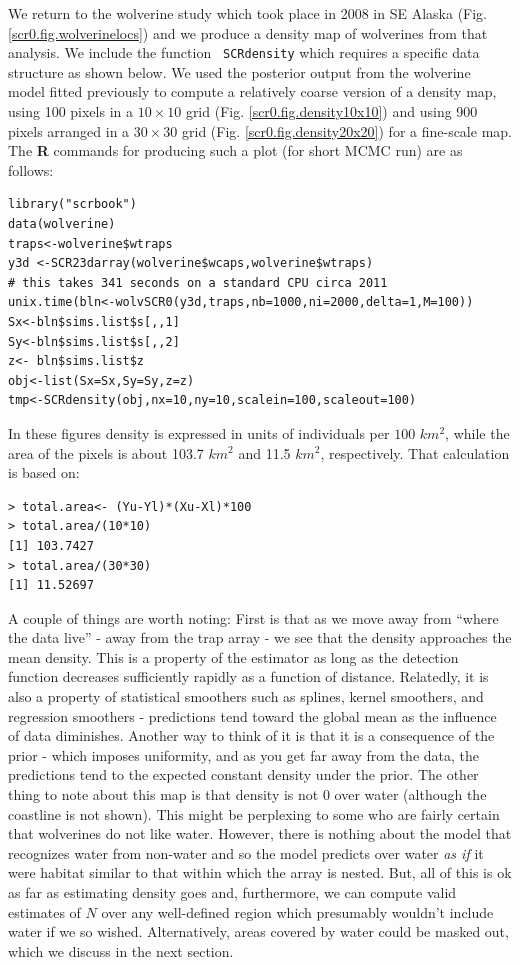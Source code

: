 {We return to the wolverine study which took place in 2008 in SE Alaska
(Fig. \ref{scr0.fig.wolverinelocs}) and we produce a density map of
wolverines from that analysis. We include the function \mbox{\tt
  SCRdensity} which requires a specific data structure as shown
below. 
We used the posterior output from the wolverine model fitted previously
to compute a relatively coarse version of a density map, using 100
pixels in a $10 \times
10$ grid (Fig. \ref{scr0.fig.density10x10}) and using 900 pixels
arranged in
 a $30 \times 30$
grid (Fig. \ref{scr0.fig.density20x20}) for a fine-scale map. The {\bf R} commands for
producing such a plot (for short MCMC run) are as follows:
{\small
\begin{verbatim}
library("scrbook")
data(wolverine)
traps<-wolverine$wtraps
y3d <-SCR23darray(wolverine$wcaps,wolverine$wtraps)
# this takes 341 seconds on a standard CPU circa 2011
unix.time(bln<-wolvSCR0(y3d,traps,nb=1000,ni=2000,delta=1,M=100))
Sx<-bln$sims.list$s[,,1]
Sy<-bln$sims.list$s[,,2]
z<- bln$sims.list$z
obj<-list(Sx=Sx,Sy=Sy,z=z)
tmp<-SCRdensity(obj,nx=10,ny=10,scalein=100,scaleout=100)
\end{verbatim}
In these figures density is
expressed in units of individuals per $100$ $km^2$, while the area of
the pixels is about 103.7 $km^2$ and 11.5 $km^2$, respectively. That
calculation is based on:
\begin{verbatim}
> total.area<- (Yu-Yl)*(Xu-Xl)*100
> total.area/(10*10)
[1] 103.7427
> total.area/(30*30)
[1] 11.52697
\end{verbatim}

A couple of things are worth noting: First is that as we move away
from ``where the data live'' - away from the trap array - we see that
the density approaches the mean density. This is a property of the
estimator as long as the detection function decreases sufficiently
rapidly as a function of distance.  Relatedly, it is also a property
of statistical smoothers such as splines, kernel smoothers, and
regression smoothers - predictions tend toward the global mean as the
influence of data diminishes. 
 Another way to think of it is that it is
a consequence of the prior - which imposes uniformity, and as you get
far away from the data, the predictions tend to the expected constant
density under the prior.  The other thing to note about this map is
that density is not $0$ over water (although the coastline is not
shown). This might be perplexing to some who are fairly certain that
wolverines do not like water. However, there is nothing about the
model that recognizes water from non-water and so the model predicts
over water {\it as if} it were habitat similar to that within which
the array is nested. But, all of this is ok as far as estimating
density goes and, furthermore, we can compute valid estimates of $N$
over any well-defined region which presumably wouldn't include water
if we so wished. Alternatively, areas covered by water could be masked
out, which we discuss in the next section.

}}
